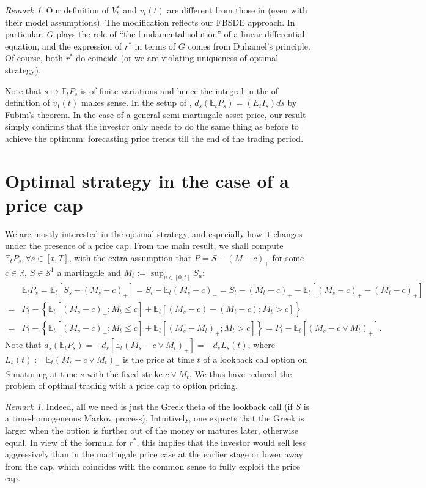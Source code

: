 \documentclass[openany,oneside]{article}
\theoremstyle{definition}
\theoremstyle{remark}
\newtheorem{rem}[thm]{Remark}
\newcommand{\E}{\mathbb{E}} %
\begin{document}
\begin{rem}
Our definition of $V^\ast_t$ and $v_i(t)$ are different from those in \cite{lehalle2017incorporating} (even with their model assumptions). The modification reflects our FBSDE approach. In particular, $G$ plays the role of ``the fundamental solution'' of a linear differential equation, and the expression of $r^\ast$ in terms of $G$ comes from Duhamel's principle. Of course, both $r^\ast$ do coincide (or we are violating uniqueness of optimal strategy).
\end{rem}

Note that $s\mapsto \E_t P_s$ is of finite variations and hence the integral in the of definition of $v_1(t)$ makes sense. In the setup of \cite{lehalle2017incorporating}, $d_s(\E_t P_s) = (E_t I_s)ds$ by Fubini's theorem. In the case of a general semi-martingale asset price, our result simply confirms that the investor only needs to do the same thing as before to achieve the optimum: forecasting price trends till the end of the trading period.


\section{Optimal strategy in the case of a price cap}
We are mostly interested in the optimal strategy, and especially how it changes under the presence of a price cap. From the main result, we shall compute $\E_t P_s, \forall s\in[t,T]$, with the extra assumption that $P=S-(M-c)_+$ for some $c\in\mathbb{R}$, $S\in\mathcal{S}^1$ a martingale and $M_t:=\sup_{u\in[0,t]}S_u$:
\begin{align*}
& \E_t P_s = \E_t[S_s-(M_s-c)_+] = S_t-\E_t(M_s-c)_+ = S_t-(M_t-c)_+ - \E_t\left[(M_s-c)_+ - (M_t-c)_+\right] \\
=& P_t -\left\{ \E_t\left[(M_s-c)_+; M_t\le c\right] + \E_t\left[(M_s-c)-(M_t-c); M_t > c\right] \right\} \\
=& P_t -\left\{ \E_t\left[(M_s-c)_+; M_t\le c\right] + \E_t\left[(M_s-M_t)_+; M_t > c\right] \right\} = P_t - \E_t\left[(M_s-c\vee M_t)_+\right].
\end{align*}
Note that $d_s(\E_t P_s) = -d_s\left[\E_t(M_s-c\vee M_t)_+\right] = -d_s L_s(t)$, where $L_s(t):=\E_t(M_s-c\vee M_t)_+$ is the price at time $t$ of a lookback call option on $S$ maturing at time $s$ with the fixed strike $c\vee M_t$. We thus have reduced the problem of optimal trading with a price cap to option pricing.

\begin{rem}
Indeed, all we need is just the Greek theta of the lookback call (if $S$ is a time-homogeneous Markov process). Intuitively, one expects that the Greek is larger when the option is further out of the money or matures later, otherwise equal. In view of the formula for $r^\ast$, this implies that the investor would sell less aggressively than in the martingale price case at the earlier stage or lower away from the cap, which coincides with the common sense to fully exploit the price cap.
\end{rem}
\end{document}
